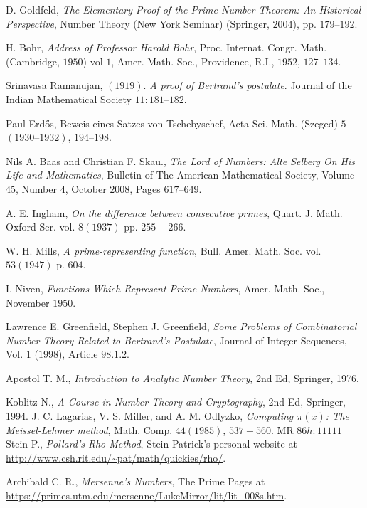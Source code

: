 \documentclass{subfiles}
\begin{document}
	\begin{thebibliography}{99}
		 D. Goldfeld, \textit{The Elementary Proof of the Prime Number Theorem: An Historical Perspective}, Number Theory (New York Seminar) (Springer, $2004$), pp. $179–192$.
		
		 H. Bohr, \textit{Address of Professor Harold Bohr}, Proc. Internat. Congr. Math. (Cambridge, $1950$) vol $1$, Amer. Math. Soc., Providence, R.I., $1952$, $127–134$.
		
		 Srinavasa Ramanujan, $(1919)$. \textit{A proof of Bertrand's postulate}. Journal of the Indian Mathematical Society $11: 181–182$.
		
		 Paul Erd\H{o}s, Beweis eines Satzes von Tschebyschef, Acta Sci. Math. (Szeged) $5$ $(1930–1932)$, $194–198$.
		
		 Nils A. Baas and Christian F. Skau., \textit{The Lord of Numbers: Alte Selberg On His Life and Mathematics}, Bulletin of The American Mathematical Society, Volume $45$, Number $4$, October $2008$, Pages $617–649$.
		
		 A. E. Ingham, \textit{On the difference between consecutive primes}, Quart. J. Math. Oxford Ser. vol. $8 (1937)$ pp. $255-266$.
		
		 W. H. Mills, \textit{A prime-representing function}, Bull. Amer. Math. Soc. vol. $53 (1947)$ p. $604$.
		
		 I. Niven, \textit{Functions Which Represent Prime Numbers}, Amer. Math. Soc., November $1950$.
		
		 Lawrence E. Greenfield, Stephen J. Greenfield, \textit{Some Problems of Combinatorial Number Theory Related to Bertrand's Postulate}, Journal of Integer Sequences, Vol. $1$ ($1998$), Article $98.1.2$.
		
		 Apostol T. M., \textit{Introduction to Analytic Number Theory}, 2nd Ed, Springer, 1976.
		
		 Koblitz N., \textit{A Course in Number Theory and Cryptography}, 2nd Ed, Springer, 1994.
		 J. C. Lagarias, V. S. Miller, and A. M. Odlyzko, \textit{Computing $\pi(x)$: The Meissel-Lehmer method}, Math. Comp. $44 (1985)$, $537-560$. MR $86h:11111$
		 Stein P., \textit{Pollard's Rho Method}, Stein Patrick's personal website at \url{http://www.csh.rit.edu/~pat/math/quickies/rho/}.
		
		 Archibald C. R., \textit{Mersenne's Numbers}, The Prime Pages at \url{https://primes.utm.edu/mersenne/LukeMirror/lit/lit_008s.htm}.
		

\end{thebibliography}
\end{document}
